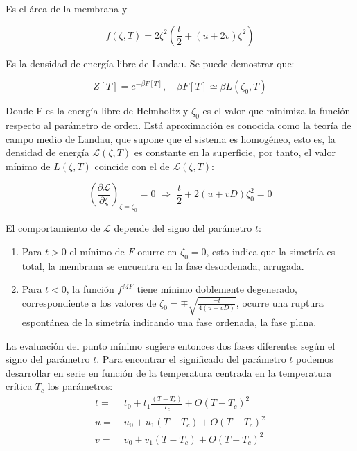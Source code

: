 Es el área de la membrana y 

\begin{equation}
f(\zeta,T)=2\zeta^2\!\left( \frac{t}{2} + (u+2v)\zeta^2\right)
\end{equation}

Es la densidad de energía libre de Landau. Se puede demostrar que:

\begin{equation}
Z[T]= e^{-\beta F[T]}, \quad \beta F[T]\simeq \beta L(\zeta_0,T)
\end{equation}

Donde F es la energía libre de Helmholtz  y $\zeta_0$ es el valor que minimiza
la función respecto al parámetro de orden. Está aproximación es conocida 
como la teoría de campo medio de Landau, que supone que el sistema es
homogéneo, esto es, la densidad de energía $\mathcal{L}(\zeta,T)$ es constante
en la superficie, por tanto, el valor mínimo de $L(\zeta,T)$ coincide con el de
$\mathcal{L}(\zeta,T)$: 

\begin{equation}
\left(\frac{\partial \mathcal{L}}{\partial \zeta}\right)_{\!\zeta=\zeta_0}\!=0 \; \Rightarrow \; \frac{t}{2}+2(u+vD)\zeta_0^2=0
\end{equation}
 
El comportamiento de $\mathcal{L}$ depende del signo del parámetro $t$:

\begin{enumerate}
\item Para $t>0$ el mínimo de $F$ ocurre en $\zeta_0=0$, esto indica que la
  simetría es total, la membrana se encuentra en la fase desordenada,
  arrugada.
\item Para $t<0$, la función $f^{MF}$ tiene mínimo doblemente
  degenerado, correspondiente a los valores de $\zeta_0=\mp
  \sqrt{\frac{-t}{4(u+vD)}}$, ocurre una ruptura espontánea de la simetría indicando
  una fase ordenada, la fase plana.
\end{enumerate}

La evaluación del punto mínimo sugiere entonces dos fases diferentes según el
signo del parámetro $t$. Para encontrar el significado del parámetro $t$
podemos desarrollar en serie en función de la temperatura centrada en la
temperatura crítica $T_c$ los parámetros:
\begin{align}
t=&\; t_0+t_1\frac{(T-T_c)}{T_c}+O(T-T_c)^2\\
u=&\; u_0+u_1(T-T_c)+O(T-T_c)^2\\
v=&\; v_0+v_1(T-T_c)+O(T-T_c)^2
\end{align}

